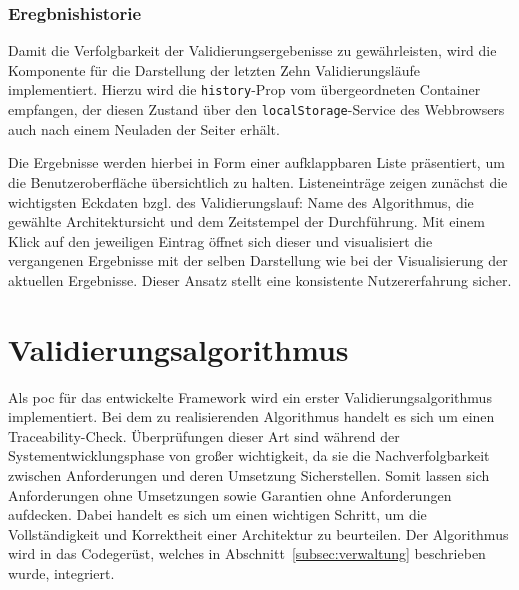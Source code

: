 \subsubsection*{Eregbnishistorie}

Damit die Verfolgbarkeit der Validierungsergebenisse zu gewährleisten, wird die Komponente für die Darstellung der letzten Zehn Validierungsläufe implementiert. Hierzu wird die \texttt{history}-Prop vom übergeordneten Container empfangen, der diesen Zustand über den \texttt{localStorage}-Service des Webbrowsers auch nach einem Neuladen der Seiter erhält.

Die Ergebnisse werden hierbei in Form einer aufklappbaren Liste präsentiert, um die Benutzeroberfläche übersichtlich zu halten. Listeneinträge zeigen zunächst die wichtigsten Eckdaten bzgl. des Validierungslauf: Name des Algorithmus, die gewählte Architektursicht und dem Zeitstempel der Durchführung. Mit einem Klick auf den jeweiligen Eintrag öffnet sich dieser und visualisiert die vergangenen Ergebnisse mit der selben Darstellung wie bei der Visualisierung der aktuellen Ergebnisse. Dieser Ansatz stellt eine konsistente Nutzererfahrung sicher.
\section{Validierungsalgorithmus}
\label{sec:validimp}

Als \gls{poc} für das entwickelte Framework wird ein erster Validierungsalgorithmus implementiert. Bei dem zu realisierenden Algorithmus handelt es sich um einen Traceability-Check. Überprüfungen dieser Art sind während der Systementwicklungsphase von großer wichtigkeit, da sie die Nachverfolgbarkeit zwischen Anforderungen und deren Umsetzung Sicherstellen. Somit lassen sich Anforderungen ohne Umsetzungen sowie Garantien ohne Anforderungen aufdecken. Dabei handelt es sich um einen wichtigen Schritt, um die Vollständigkeit und Korrektheit einer Architektur zu beurteilen. Der Algorithmus wird in das Codegerüst, welches in Abschnitt~\ref{subsec:verwaltung} beschrieben wurde, integriert.

